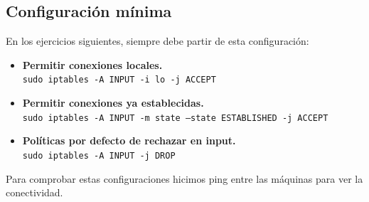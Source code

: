 \documentclass[12pt,letterpaper]{article}
\begin{document}
\subsection{Configuración mínima}
En los ejercicios siguientes, siempre debe partir de esta configuración:
\begin{itemize}
	\item \textbf{Permitir conexiones locales.} \\
	\texttt{sudo iptables -A INPUT -i lo -j ACCEPT}
	\item \textbf{Permitir conexiones ya establecidas.} \\
	\texttt{sudo iptables -A INPUT -m state ---state ESTABLISHED -j ACCEPT}
	\item \textbf{Políticas por defecto de rechazar en input.} \\
	\texttt{sudo iptables -A INPUT -j DROP}
\end{itemize}

Para comprobar estas configuraciones hicimos ping entre las máquinas para ver la conectividad.
\end{document}
